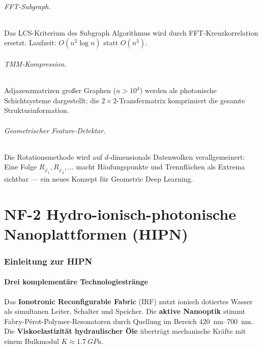 ﻿\documentclass[a4paper,12pt]{scrreprt}
\theoremstyle{definition}
\begin{document}
\paragraph{FFT-Subgraph.} Das LCS-Kriterium des Subgraph Algorithmus wird
durch FFT-Kreuzkorrelation ersetzt. Laufzeit: $O(n^2 \log n)$ statt
$O(n^3)$.

\paragraph{TMM-Kompression.} Adjazenzmatrizen großer Graphen ($n>10^4$)
werden als photonische Schichtsysteme dargestellt; die $2\times 2$-Transfermatrix
komprimiert die gesamte Strukturinformation.

\paragraph{Geometrischer Feature-Detektor.} Die Rotationsmethode wird
auf $d$-dimensionale Datenwolken verallgemeinert: Eine Folge
$R_{\varphi_1},R_{\varphi_2},\ldots$ macht Häufungspunkte und Trennflächen
als Extrema sichtbar --- ein neues Konzept für Geometric Deep Learning.

\part{NF-2 \quad Hydro-ionisch-photonische Nanoplattformen (HIPN)}
\label{part:nf2}

\section{Einleitung zur HIPN}

\subsection{Drei komplementäre Technologiestränge}

Das \textbf{Ionotronic Reconfigurable Fabric} (IRF) nutzt ionisch
dotiertes Wasser als simultanen Leiter, Schalter und Speicher. Die
\textbf{aktive Nanooptik} stimmt Fabry-Pérot-Polymer-Resonatoren durch
Quellung im Bereich \SIrange{420}{700}{nm}. Die \textbf{Viskoelastizität
hydraulischer Öle} überträgt mechanische Kräfte mit einem Bulkmodul
$K \approx \SI{1.7}{GPa}$.
\end{document}
